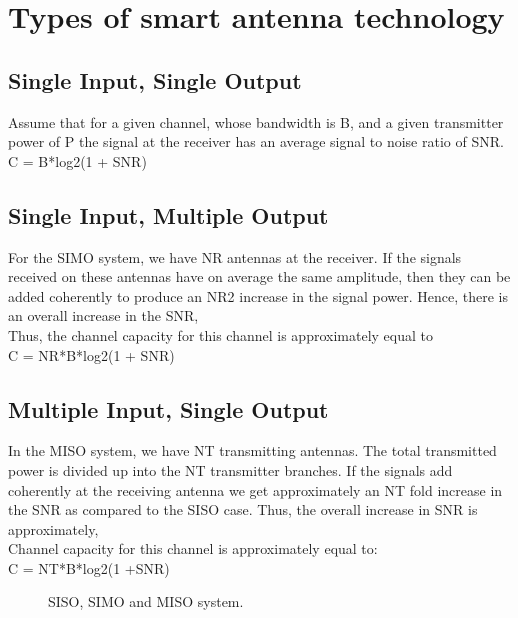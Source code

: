 \documentclass[12pt]{report}
\begin{document}
\section*{Types of smart antenna technology}
\subsection*{Single Input, Single Output}
Assume that for a given channel, whose bandwidth is B, and a given
transmitter power of P the signal at the receiver has an average signal
to noise ratio of SNR.\\
C = B*log2(1 + SNR) 
\subsection*{Single Input, Multiple Output}
For the SIMO system, we have NR antennas at the receiver. If the signals
received on these antennas have on average the same amplitude, then
they can be added coherently to produce an NR2 increase in the signal
power. Hence, there is an overall increase in the SNR,\\
Thus, the channel capacity for this channel is approximately equal to\\
C = NR*B*log2(1 + SNR)
\subsection*{Multiple Input, Single Output}
In the MISO system, we have NT transmitting antennas. The total
transmitted power is divided up into the NT transmitter branches. If the
signals add coherently at the receiving antenna we get approximately
an NT fold increase in the SNR as compared to the SISO case. Thus,
the overall increase in SNR is approximately,\\
Channel capacity for this channel is approximately equal to:\\
C = NT*B*log2(1 +SNR)


\begin{figure}[!hbt]
		\begin{center}
		\caption{SISO, SIMO and MISO system.}
		\label{fig:tf_plot}
		\end{center}
	\end{figure}
\end{document}
